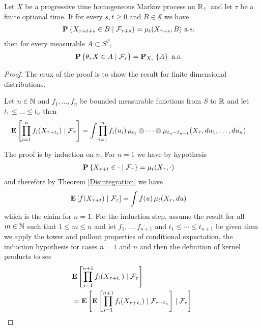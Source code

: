 \begin{prop}\label{StrongMarkovFromOneDimensionalDistribution}Let $X$ be a progressive time homogeneous Markov process on
  $\reals_+$ and let $\tau$ be a finite optional
  time.  If for every $s,t \geq 0$ and $B \in \mathcal{S}$ we have
\begin{align*}
\cprobability{\mathcal{F}_{\tau+s}}{X_{\tau + t + s} \in B} &= \mu_t(X_{\tau+s}, B) \text{ a.s.}
\end{align*}
then for every measurable
  $A \subset S^T$,
\begin{align*}
\cprobability{\mathcal{F}_\tau}{\theta_\tau X \in A} &= \sprobability{A}{X_\tau} \text{ a.s.}
\end{align*}
\end{prop}
\begin{proof}
The crux of the proof is to show the result for finite dimensional distributions.
\begin{clm}Let $n \in \naturals$ and $f_1, \dotsc, f_n$ be bounded measurable functions from $S$ to $\reals$ and
let $t_1 \leq \dotsc \leq t_n$ then 
\begin{align*}
\cexpectationlong{\mathcal{F}_\tau}{\prod_{i=1}^n f_i(X_{\tau + t_i})} 
&= \int \prod_{i=1}^n f_i(u_i) \, \mu_{t_1} \otimes \dotsb \otimes \mu_{t_n - t_{n-1}}(X_\tau, du_1, \dotsc, du_n)
\end{align*}
\end{clm}
The proof is by induction on $n$.  For $n=1$ we have by hypothesis 
\begin{align*}
\cprobability{\mathcal{F}_\tau}{X_{\tau + t} \in \cdot} &= \mu_t(X_\tau, \cdot)
\end{align*} 
and therefore
by Theorem \ref{Disintegration} we have 
\begin{align*}
\cexpectationlong{\mathcal{F}_\tau}{f(X_{\tau + t})} &= \int f(u) \, \mu_t(X_\tau, du)
\end{align*}
which is the claim for $n=1$.  For the induction step, assume the result for all 
$m \in \naturals$ such that $1 \leq m \leq n$ and let $f_1, \dotsc, f_{n+1}$ and $t_1 \leq \dotsb \leq t_{n+1}$ be given then we apply the tower and pullout properties of conditional expectation, the induction 
hypothesis for cases $n=1$ and $n$ and then the definition of kernel products to see
\begin{align*}
&\cexpectationlong{\mathcal{F}_\tau}{\prod_{i=1}^{n+1} f_i(X_{\tau + t_i})}  \\
&=\cexpectationlong{\mathcal{F}_\tau}{\cexpectationlong{\mathcal{F}_{\tau+t_n}}{\prod_{i=1}^{n+1} f_i(X_{\tau + t_i})} } \\

\end{align*}
\end{proof}
